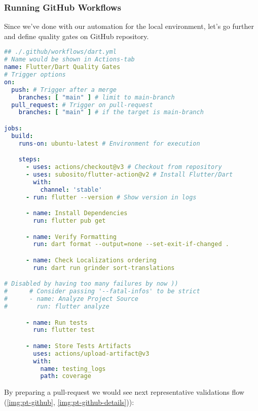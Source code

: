 

\subsubsection{Running GitHub Workflows}

Since we've done with our automation for the local environment, let's go further and define quality gates on GitHub 
repository.

\begin{lstlisting}[language=yaml]
## ./.github/workflows/dart.yml
# Name would be shown in Actions-tab
name: Flutter/Dart Quality Gates 
# Trigger options
on:
  push: # Trigger after a merge
    branches: [ "main" ] # limit to main-branch
  pull_request: # Trigger on pull-request
    branches: [ "main" ] # if the target is main-branch

jobs:
  build:
    runs-on: ubuntu-latest # Environment for execution

    steps:
      - uses: actions/checkout@v3 # Checkout from repository
      - uses: subosito/flutter-action@v2 # Install Flutter/Dart
        with:
          channel: 'stable'
      - run: flutter --version # Show version in logs

      - name: Install Dependencies
        run: flutter pub get

      - name: Verify Formatting
        run: dart format --output=none --set-exit-if-changed .

      - name: Check Localizations ordering
        run: dart run grinder sort-translations

# Disabled by having too many failures by now )) 
#      # Consider passing '--fatal-infos' to be strict
#      - name: Analyze Project Source
#        run: flutter analyze

      - name: Run tests
        run: flutter test

      - name: Store Tests Artifacts
        uses: actions/upload-artifact@v3
        with:
          name: testing_logs
          path: coverage
\end{lstlisting}

\noindent By preparing a pull-request we would see next representative validations flow 
(\cref{img:pt-github}, \cref{img:pt-github-details})):




